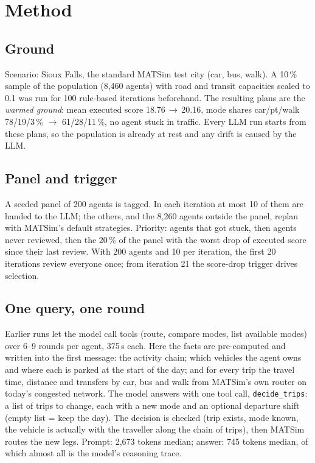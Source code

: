 \documentclass[10pt,a4paper]{article}
\begin{document}
\section{Method}
\subsection{Ground}
Scenario: Sioux Falls, the standard MATSim test city (car, bus, walk). A 10\,\% sample of the population (8,460 agents) with road and transit capacities scaled to 0.1 was run for 100 rule-based iterations beforehand. The resulting plans are the \emph{warmed ground}: mean executed score 18.76\,$\rightarrow$\,20.16, mode shares car/pt/walk 78/19/3\,\% $\rightarrow$ 61/28/11\,\%, no agent stuck in traffic. Every LLM run starts from these plans, so the population is already at rest and any drift is caused by the LLM.

\subsection{Panel and trigger}
A seeded panel of 200 agents is tagged. In each iteration at most 10 of them are handed to the LLM; the others, and the 8,260 agents outside the panel, replan with MATSim's default strategies. Priority: agents that got stuck, then agents never reviewed, then the 20\,\% of the panel with the worst drop of executed score since their last review. With 200 agents and 10 per iteration, the first 20 iterations review everyone once; from iteration 21 the score-drop trigger drives selection.

\subsection{One query, one round}
Earlier runs let the model call tools (route, compare modes, list available modes) over 6--9 rounds per agent, 375\,s each. Here the facts are pre-computed and written into the first message: the activity chain; which vehicles the agent owns and where each is parked at the start of the day; and for every trip the travel time, distance and transfers by car, bus and walk from MATSim's own router on today's congested network. The model answers with one tool call, \texttt{decide\_trips}: a list of trips to change, each with a new mode and an optional departure shift (empty list = keep the day). The decision is checked (trip exists, mode known, the vehicle is actually with the traveller along the chain of trips), then MATSim routes the new legs. Prompt: 2,673 tokens median; answer: 745 tokens median, of which almost all is the model's reasoning trace.
\end{document}
